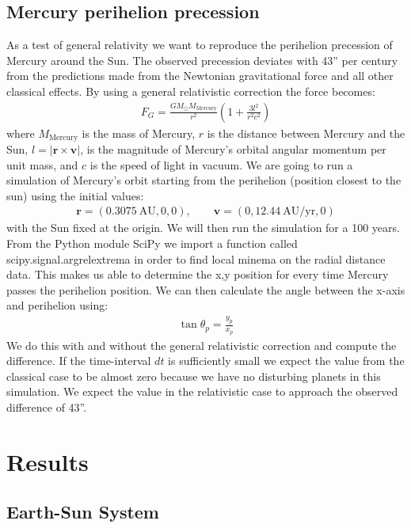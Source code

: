 \documentclass[american,a4paper,12pt]{article}
\renewcommand{\vec}[1]{\mathbf{#1}} %
\newcommand{\MS}{\ensuremath{M_{\odot}}} %
\begin{document}
\subsection{Mercury perihelion precession}
As a test of general relativity we want to reproduce the perihelion precession of Mercury around the Sun. The observed precession deviates with 43'' per century from the predictions made from the Newtonian gravitational force and all other classical effects. By using a general relativistic correction the force becomes:
\begin{align}
    F_G = \frac{G\MS M_{\text{Mercury}}}{r^2}(1 + \frac{3l^2}{r^2c^2})
    \label{eq:GR_gravity}
\end{align}
where $M_{\text{Mercury}}$ is the mass of Mercury, $r$ is the distance between Mercury and the Sun, $l = |\vec{r} \times \vec{v}|$, is the magnitude of Mercury's orbital angular momentum per unit mass, and $c$ is the speed of light in vacuum. We are going to run a simulation of Mercury's orbit starting from the perihelion (position closest to the sun) using the initial values:
\begin{align*}
    \vec{r} = (0.3075 \ \text{AU}, 0, 0), \qquad \vec{v} = (0, 12.44 \ \text{AU/yr}, 0)
\end{align*}
with the Sun fixed at the origin. We will then run the simulation for a 100 years. From the Python module SciPy we import a function called scipy.signal.argrelextrema\cite{argrelextrema} in order to find local minema on the radial distance data. This makes us able to determine the x,y position for every time Mercury passes the perihelion position. We can then calculate the angle between the x-axis and perihelion using:
\begin{align*}
    \tan{\theta_p} = \frac{y_p}{x_p}
\end{align*}
We do this with and without the general relativistic correction and compute the difference. If the time-interval $dt$ is sufficiently small we expect the value from the classical case to be almost zero because we have no disturbing planets in this simulation. We expect the value in the relativistic case to approach the observed difference of 43''.

\newpage
\section{Results}
\subsection{Earth-Sun System}
\end{document}
